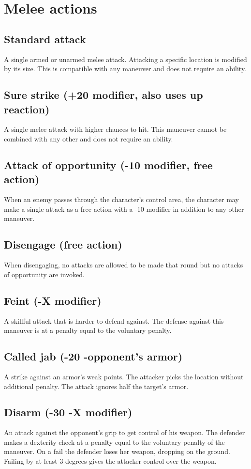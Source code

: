\section{Melee actions}
\subsection*{Standard attack}
A single armed or unarmed melee attack. Attacking a specific location is modified by its size. This is compatible with any maneuver and does not require an ability. 
\subsection*{Sure strike (+20 modifier, also uses up reaction)}
A single melee attack with higher chances to hit. This maneuver cannot be combined with any other and does not require an ability.
\subsection*{Attack of opportunity (-10 modifier, free action)}
When an enemy passes through the character’s control area, the character may make a single attack as a free action with a -10 modifier in addition to any other maneuver.
\subsection*{Disengage (free action)}
When disengaging, no attacks are allowed to be made that round but no attacks of opportunity are invoked.
\subsection*{Feint (-X modifier)}
A skillful attack that is harder to defend against. The defense against this maneuver is at a penalty equal to the voluntary penalty.
\subsection*{Called jab (-20 -opponent’s armor)}
A strike against an armor’s weak points. The attacker picks the location without additional penalty. The attack ignores half the target’s armor.
\subsection*{Disarm (-30 -X modifier)}
An attack against the opponent’s grip to get control of his weapon. The defender makes a dexterity check at a penalty equal to the voluntary penalty of the maneuver. On a fail the defender loses her weapon, dropping on the ground. Failing by at least 3 degrees gives the attacker control over the weapon.
